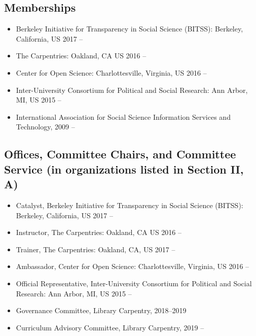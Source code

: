 \subsection{Memberships}

\begin{itemize}[label={},leftmargin=!,labelindent=5pt,itemindent=-15pt]
  \item Berkeley Initiative for Transparency in Social Science (BITSS): Berkeley, California, US 2017 --
  \item The Carpentries: Oakland, CA US 2016 --
  \item Center for Open Science: Charlottesville, Virginia, US 2016 --
  \item Inter-University Consortium for Political and Social Research: Ann Arbor, MI, US 2015 --
  \item International Association for Social Science Information Services and Technology, 2009 --
\end{itemize}

\subsection{Offices, Committee Chairs, and Committee Service (in organizations listed in Section II, A)}


\begin{itemize}[label={},leftmargin=!,labelindent=5pt,itemindent=-15pt]
    \item Catalyst, Berkeley Initiative for Transparency in Social Science (BITSS): Berkeley, California, US 2017 --
    \item Instructor, The Carpentries: Oakland, CA US 2016 --
    \item Trainer, The Carpentries: Oakland, CA, US  2017 --
    \item Ambassador, Center for Open Science: Charlottesville, Virginia, US 2016 --
    \item Official Representative, Inter-University Consortium for Political and Social Research: Ann Arbor, MI, US 2015 --
    \item Governance Committee, Library Carpentry, 2018--2019
    \item Curriculum Advisory Committee, Library Carpentry, 2019 --
\end{itemize}


